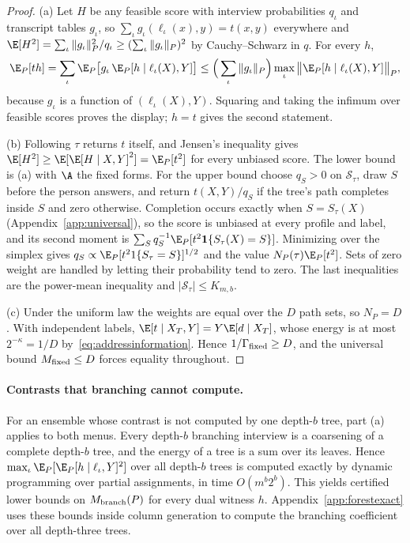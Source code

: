 \begin{proof}
(a) Let $H$ be any feasible score with interview probabilities $q_\iota$ and
transcript tables $g_\iota$, so $\sum_\iota g_\iota(\ell_\iota(x),y)=t(x,y)$
everywhere and $\E[H^2]=\sum_\iota\|g_\iota\|_P^2/q_\iota\ge(\sum_\iota\|g_\iota\|_P)^2$
by Cauchy--Schwarz in $q$. For every $h$,
\[
 \E_P[th]=\sum_\iota\E_P\big[g_\iota\,\E_P[h\mid\ell_\iota(X),Y]\big]
 \le\Big(\sum_\iota\|g_\iota\|_P\Big)\max_\iota\big\|\E_P[h\mid\ell_\iota(X),Y]\big\|_P,
\]
because $g_\iota$ is a function of $(\ell_\iota(X),Y)$. Squaring and taking
the infimum over feasible scores proves the display; $h=t$ gives the second
statement.

(b) Following $\tau$ returns $t$ itself, and Jensen's inequality gives
$\E[H^2]\ge\E[\E[H\mid X,Y]^2]=\E_P[t^2]$ for every unbiased score. The lower
bound is (a) with $\A$ the fixed forms. For the upper bound choose
$q_S>0$ on $\mathcal S_\tau$, draw $S$ before the person answers, and return
$t(X,Y)/q_S$ if the tree's path completes inside $S$ and zero otherwise.
Completion occurs exactly when $S=S_\tau(X)$
(Appendix~\ref{app:universal}), so the score is unbiased at every profile and
label, and its second moment is
$\sum_Sq_S^{-1}\E_P[t^2\mathbf 1\{S_\tau(X)=S\}]$. Minimizing over the simplex
gives $q_S\propto\E_P[t^21\{S_\tau=S\}]^{1/2}$ and the value
$N_P(\tau)\E_P[t^2]$. Sets of zero weight are handled by letting their
probability tend to zero. The last inequalities are the power-mean
inequality and $|\mathcal S_\tau|\le K_{m,b}$.

(c) Under the uniform law the weights are equal over the $D$ path sets, so
$N_P=D$. With independent labels,
$\E[t\mid X_T,Y]=Y\E[d\mid X_T]$, whose energy is at most $2^{-\kappa}=1/D$
by~\eqref{eq:addressinformation}. Hence $1/\Gamma_{\rm fixed}\ge D$, and the
universal bound $M_{\rm fixed}\le D$ forces equality throughout.
\end{proof}



\paragraph{Contrasts that branching cannot compute.}
For an ensemble whose contrast is not computed by one depth-$b$ tree, part (a)
applies to both menus. Every depth-$b$ branching interview is a coarsening of
a complete depth-$b$ tree, and the energy of a tree is a sum over its leaves.
Hence $\max_\iota\E_P[\E_P[h\mid\ell_\iota,Y]^2]$ over all depth-$b$ trees is
computed exactly by dynamic programming over partial assignments, in time
$O(m^b2^b)$. This yields certified lower bounds on $M_{\rm branch}(P)$ for every
dual witness $h$. Appendix~\ref{app:forestexact} uses these bounds inside
column generation to compute the branching coefficient over all depth-three
trees.

